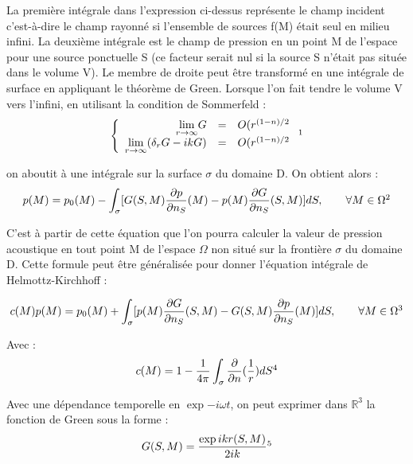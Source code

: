 La  première  intégrale  dans  l'expression  ci-dessus  représente  le  champ  incident  c'est-à-dire  le  champ  rayonné  si  l'ensemble  de  sources  f(M)  était  seul  en  milieu  infini.  La deuxième  intégrale  est  le  champ  de  pression  en  un  point  M  de  l'espace  pour  une  source ponctuelle  S  (ce  facteur  serait  nul  si  la  source  S  n'était  pas  située  dans  le  volume  V).  Le membre  de  droite  peut  être  transformé  en  une  intégrale  de  surface  en  appliquant  le théorème  de  Green. Lorsque  l'on  fait  tendre  le  volume  V  vers  l'infini,  en  utilisant  la condition de Sommerfeld :
\begin{equation}
   \left \{
	\begin{array}{r c l}
		\underset{r \to \infty}{\lim} G &=& O(r^{(1-n)/2} \\
		\underset{r \to \infty}{\lim} (\delta_r G - ikG) &=& O(r^{(1-n)/2} 
	\end{array}
   \right .
   \footnotemark
\end{equation}   

on aboutit à une intégrale sur la surface $\sigma$ du domaine D. On obtient alors :
\begin{equation}
p(M) = p_0(M) - \int_\sigma [G(S,M) \frac{\partial p}{\partial n_S}(M) - p(M) \frac{\partial G}{\partial n_S}(S,M)] dS,	 	\qquad  \forall M  \in \Omega
\footnotemark
\end{equation}


C'est à partir de cette équation que l'on pourra calculer la valeur de pression acoustique en tout point M de l'espace $\Omega$ non situé sur la frontière $\sigma$ du domaine D. Cette formule peut être généralisée pour donner l'équation intégrale de Helmottz-Kirchhoff :

\begin{equation}
c(M)p(M) = p_0(M) + \int_\sigma [p(M) \frac{\partial G}{\partial n_S}(S,M) - G(S,M) \frac{\partial p}{\partial n_S}(M)] dS,	 	\qquad  \forall M  \in \Omega
\footnotemark
\end{equation}

Avec : \\
\begin{equation}
c(M) = 1 - \frac{1}{4\pi} \int_\sigma \frac{\partial}{\partial n} (\frac{1}{r})dS
\footnotemark
\end{equation}


Avec une dépendance temporelle en $\exp{-i \omega t}$, on peut exprimer dans $\mathbb{R}^3$ la fonction de Green sous la forme :
\begin{equation}
G(S,M) = \frac{\exp{ikr(S,M)}}{2ik}
\footnotemark
\end{equation}




